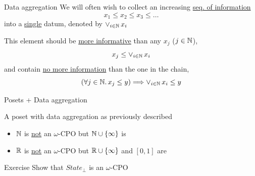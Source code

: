 \documentclass{beamer}
\begin{document}
\begin{frame}{Data aggregation}
        We will often wish to collect an increasing \alert{\underline{seq. of information}}
        \[
                x_1 \leq x_2 \leq x_3 \leq \dots
        \]
        into a \alert{\underline{single}} datum, denoted by $\vee_{i \in \mathbb{N}}\, x_i$

        \pause
        \bigskip
        This element should be \alert{\underline{more informative}}
        than any $x_j$ ($j \in \mathbb{N}$), \ie\
        \[
                x_j \leq \vee_{i \in \mathbb{N}}\, x_i
        \]
        and contain \alert{\underline{no more information}} than the one
        in the chain, \ie\
        \[
                (\forall j \in \mathbb{N}. \, x_j \leq y) \Longrightarrow
                \vee_{i \in \mathbb{N}}\, x_i \leq y
        \]
\end{frame}

\begin{frame}{Posets + Data aggregation}

        \begin{definition}
                A poset with data aggregation as previously described
        \end{definition}

        \begin{examples}
                \begin{itemize}
                        \item $\mathbb{N}$ is \underline{not} an $\omega$-CPO but
                                $\mathbb{N} \cup \{ \infty \}$ is
                        \item $\mathbb{R}$ is \underline{not} an $\omega$-CPO but
                                $\mathbb{R} \cup \{ \infty \}$ and $[0,1]$ are
                \end{itemize}
        \end{examples}

        \pause
        \bigskip
        \begin{block}{Exercise}
                Show that $State_\bot$ is an $\omega$-CPO
        \end{block}
\end{frame}


\end{document}
